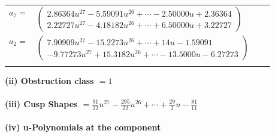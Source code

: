 \documentclass[1p]{elsarticle_modified}
\theoremstyle{definition}
\begin{document}
\begin{tabular}{m{7pt} m{180pt} m{7pt} m{180pt} }
\flushright $a_{7}=$&$\begin{pmatrix}2.86364 u^{27}-5.59091 u^{26}+\cdots-2.50000 u+2.36364\\2.22727 u^{27}-4.18182 u^{26}+\cdots+6.50000 u+3.22727\end{pmatrix}$ \\
\flushright $a_{2}=$&$\begin{pmatrix}7.90909 u^{27}-15.2273 u^{26}+\cdots+14 u-1.59091\\-9.77273 u^{27}+15.3182 u^{26}+\cdots-13.5000 u-6.27273\end{pmatrix}$\\&\end{tabular}
\flushleft \textbf{(ii) Obstruction class $= 1$}\\~\\
\flushleft \textbf{(iii) Cusp Shapes $= \frac{91}{22} u^{27}-\frac{295}{22} u^{26}+\cdots+\frac{29}{2} u-\frac{81}{11}$}\\~\\
\newpage\renewcommand{\arraystretch}{1}
\flushleft \textbf{(iv) u-Polynomials at the component}\newline \\
\end{document}
